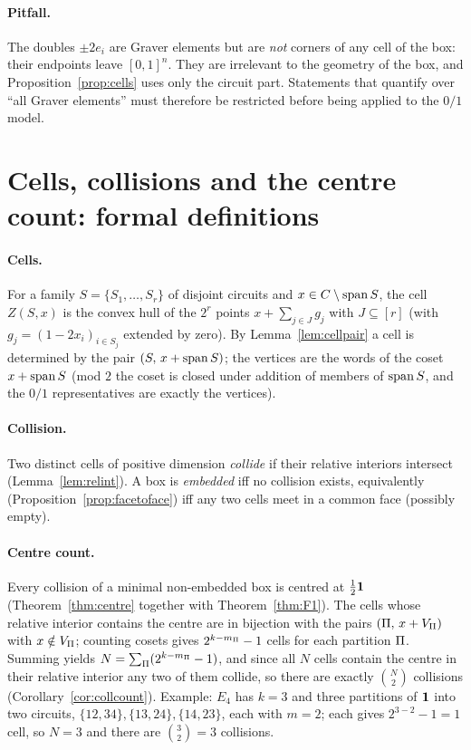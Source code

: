 \paragraph{Pitfall.} The doubles $\pm2e_i$ are Graver elements but are \emph{not} corners of any cell of the box: their endpoints leave $[0,1]^n$. They are irrelevant to the geometry of the box, and Proposition~\ref{prop:cells} uses only the circuit part. Statements that quantify over ``all Graver elements'' must therefore be restricted before being applied to the $0/1$ model.

\section{Cells, collisions and the centre count: formal definitions}\label{app:C}

\paragraph{Cells.} For a family $S=\{S_1,\dots,S_r\}$ of disjoint circuits and $x\in C\setminus\operatorname{span} S$, the cell $Z(S,x)$ is the convex hull of the $2^r$ points $x+\sum_{j\in J}g_j$ with $J\subseteq[r]$ (with $g_j=(1-2x_i)_{i\in S_j}$ extended by zero). By Lemma~\ref{lem:cellpair} a cell is determined by the pair $(S,\,x+\operatorname{span} S)$; the vertices are the words of the coset $x+\operatorname{span} S$ (mod $2$ the coset is closed under addition of members of $\operatorname{span} S$, and the $0/1$ representatives are exactly the vertices).

\paragraph{Collision.} Two distinct cells of positive dimension \emph{collide} if their relative interiors intersect (Lemma~\ref{lem:relint}). A box is \emph{embedded} iff no collision exists, equivalently (Proposition~\ref{prop:facetoface}) iff any two cells meet in a common face (possibly empty).

\paragraph{Centre count.} Every collision of a minimal non-embedded box is centred at $\tfrac12\mathbf 1$ (Theorem~\ref{thm:centre} together with Theorem~\ref{thm:F1}). The cells whose relative interior contains the centre are in bijection with the pairs $(\Pi,\,x+V_\Pi)$ with $x\notin V_\Pi$; counting cosets gives $2^{k-m_\Pi}-1$ cells for each partition $\Pi$. Summing yields $N=\sum_\Pi(2^{k-m_\Pi}-1)$, and since all $N$ cells contain the centre in their relative interior any two of them collide, so there are exactly $\binom N2$ collisions (Corollary~\ref{cor:collcount}). Example: $E_4$ has $k=3$ and three partitions of $\mathbf 1$ into two circuits, $\{12,34\},\{13,24\},\{14,23\}$, each with $m=2$; each gives $2^{3-2}-1=1$ cell, so $N=3$ and there are $\binom32=3$ collisions.

